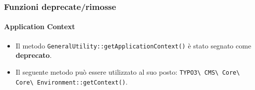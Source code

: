 
\begin{frame}[fragile]
	\frametitle{Funzioni deprecate/rimosse}
	\framesubtitle{Application Context}

	\lstset{basicstyle=\tiny\ttfamily}

	\begin{itemize}
		\item Il metodo \texttt{GeneralUtility::getApplicationContext()} è stato segnato come \textbf{deprecato}.
		\item Il seguente metodo può essere utilizzato al suo posto:\newline
		 	\texttt{TYPO3\textbackslash
				CMS\textbackslash
				Core\textbackslash
				Core\textbackslash
				Environment::getContext()}.

	\end{itemize}

\end{frame}


